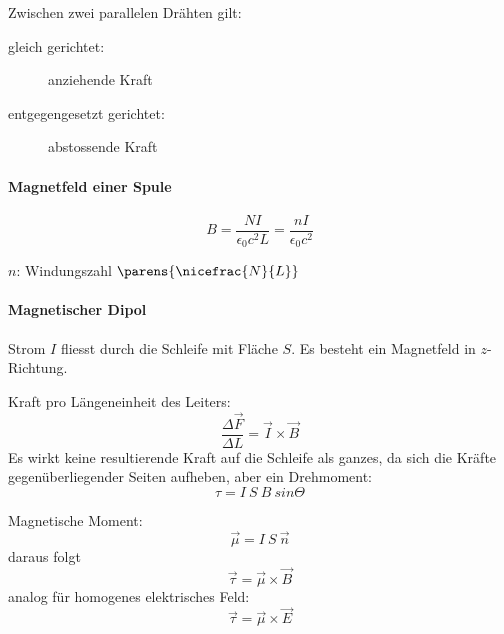 			Zwischen zwei parallelen Drähten gilt:
			\begin{description}
				\item[gleich gerichtet:] anziehende Kraft
				\item[entgegengesetzt gerichtet:] abstossende Kraft
			\end{description}
		
		\paragraph{Magnetfeld einer Spule} %
			\begin{equation}
				B = \frac{N I}{\epsilon_0 c^2 L} = \frac{n I}{\epsilon_0 c^2} \label{eq:magnetfeld_spule}
			\end{equation}
			\begin{tightitemize}
				\item[$n$:] Windungszahl $\parens{\nicefrac{N}{L}}$
			\end{tightitemize}
		
		\paragraph{Magnetischer Dipol} %
			Strom $I$ fliesst durch die Schleife mit Fläche $S$. Es besteht ein Magnetfeld in $z$-Richtung.
			
			Kraft pro Längeneinheit des Leiters:
			\begin{equation*}
				\frac{\Delta \vec F}{\Delta L} = \vec I \times \vec B
			\end{equation*}
			Es wirkt keine resultierende Kraft auf die Schleife als ganzes, da sich die Kräfte gegenüberliegender Seiten aufheben, aber ein Drehmoment:
			\begin{equation*}
				\tau = I\:S\:B\:sin \Theta
			\end{equation*}
			
			Magnetische Moment:
			\begin{equation*}
				\vec \mu = I\:S\:\vec n
			\end{equation*}
			daraus folgt
			\begin{equation*}
				\vec \tau = \vec \mu \times \vec B
			\end{equation*}
			analog für homogenes elektrisches Feld:
			\begin{equation*}
				\vec \tau = \vec \mu \times \vec E
			\end{equation*}
		
